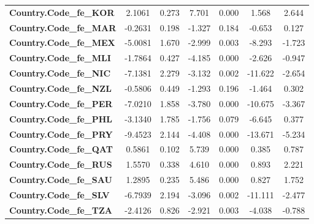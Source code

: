 \begin{center}
\begin{tabular}{lcccccc}
\textbf{Country.Code\_fe\_KOR}                                     &       2.1061  &        0.273     &     7.701  &         0.000        &        1.568    &        2.644     \\
\textbf{Country.Code\_fe\_MAR}                                     &      -0.2631  &        0.198     &    -1.327  &         0.184        &       -0.653    &        0.127     \\
\textbf{Country.Code\_fe\_MEX}                                     &      -5.0081  &        1.670     &    -2.999  &         0.003        &       -8.293    &       -1.723     \\
\textbf{Country.Code\_fe\_MLI}                                     &      -1.7864  &        0.427     &    -4.185  &         0.000        &       -2.626    &       -0.947     \\
\textbf{Country.Code\_fe\_NIC}                                     &      -7.1381  &        2.279     &    -3.132  &         0.002        &      -11.622    &       -2.654     \\
\textbf{Country.Code\_fe\_NZL}                                     &      -0.5806  &        0.449     &    -1.293  &         0.196        &       -1.464    &        0.302     \\
\textbf{Country.Code\_fe\_PER}                                     &      -7.0210  &        1.858     &    -3.780  &         0.000        &      -10.675    &       -3.367     \\
\textbf{Country.Code\_fe\_PHL}                                     &      -3.1340  &        1.785     &    -1.756  &         0.079        &       -6.645    &        0.377     \\
\textbf{Country.Code\_fe\_PRY}                                     &      -9.4523  &        2.144     &    -4.408  &         0.000        &      -13.671    &       -5.234     \\
\textbf{Country.Code\_fe\_QAT}                                     &       0.5861  &        0.102     &     5.739  &         0.000        &        0.385    &        0.787     \\
\textbf{Country.Code\_fe\_RUS}                                     &       1.5570  &        0.338     &     4.610  &         0.000        &        0.893    &        2.221     \\
\textbf{Country.Code\_fe\_SAU}                                     &       1.2895  &        0.235     &     5.486  &         0.000        &        0.827    &        1.752     \\
\textbf{Country.Code\_fe\_SLV}                                     &      -6.7939  &        2.194     &    -3.096  &         0.002        &      -11.111    &       -2.477     \\
\textbf{Country.Code\_fe\_TZA}                                     &      -2.4126  &        0.826     &    -2.921  &         0.003        &       -4.038    &       -0.788     \\
\bottomrule
\end{tabular}
\end{center}